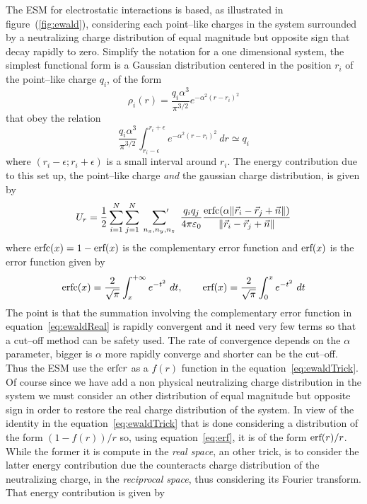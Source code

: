 The \ac{ESM} for electrostatic interactions is based, as illustrated in figure~(\ref{fig:ewald}), considering each point--like charges in the system surrounded by a neutralizing charge distribution of equal magnitude but opposite sign that decay rapidly to zero. Simplify the notation for a one dimensional system, the simplest functional form is a Gaussian distribution centered in the position $r_i$ of the point--like charge $q_i$, of the form
\begin{equation}
	\rho_i(r) = \frac{q_i\alpha^3}{\pi^{3/2}}e^{-\alpha^2 (r - r_i)^2}
\end{equation}
that obey the relation
\begin{equation*}
	\frac{q_i\alpha^3}{\pi^{3/2}}\int_{r_i-\epsilon}^{r_i+\epsilon}e^{-\alpha^2 (r - r_i)^2}\ dr \simeq q_i
\end{equation*}
where $(r_i-\epsilon; r_i+\epsilon)$ is a small interval around $r_i$. The energy contribution due to this set up, the point--like charge \textit{and} the gaussian charge distribution, is given by
\begin{equation}
	U_r = \frac{1}{2}\sum_{i=1}^N\sum_{j=1}^N\ \sideset{}{'}\sum_{n_x,n_y,n_z}\ \frac{q_iq_j}{4 \pi \varepsilon_0} \frac{\erfc{(\alpha \| \vec r_i - \vec r_j + \vec n \|)}}{\| \vec r_i - \vec r_j + \vec n \|}
	\label{eq:ewaldReal}
\end{equation}
where $\text{erfc}(x) = 1-\text{erf}(x)$ is the complementary error function and $\text{erf}(x)$ is the error function given by
\begin{equation}
	\text{erfc}(x) = \frac{2}{\sqrt{\pi}}\int_{x}^{+\infty} e^{-t^2}\ dt, \qquad \text{erf}(x) = \frac{2}{\sqrt{\pi}}\int_{0}^{x} e^{-t^2}\ dt
	\label{eq:erf}
\end{equation}
The point is that the summation involving the complementary error function in equation~\eqref{eq:ewaldReal} is rapidly convergent and it need very few terms so that a cut--off method can be safety used. The rate of convergence depends on the $\alpha$ parameter, bigger is $\alpha$ more rapidly converge and shorter can be the cut--off.
Thus the \ac{ESM} use the $\text{erfc}r$ as a $f(r)$ function in the equation~\eqref{eq:ewaldTrick}. Of course since we have add a non physical neutralizing charge distribution in the system we must consider an other distribution of equal magnitude but opposite sign in order to restore the real charge distribution of the system. In view of the identity in the equation~\eqref{eq:ewaldTrick} that is done considering a distribution of the form $(1-f(r))/r$ so, using equation~\eqref{eq:erf}, it is of the form $\text{erf}(r)/r$. While the former it is compute in the \textit{real space}, an other trick, is to consider the latter energy contribution due the counteracts charge distribution of the neutralizing charge, in the \textit{reciprocal space}, thus considering its Fourier transform. That energy contribution is given by

